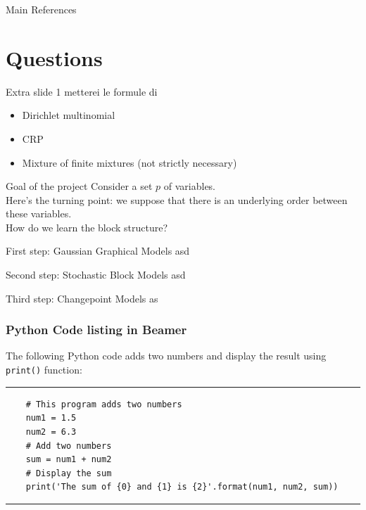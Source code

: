 \begin{frame}{Main References}
       \nocite{*}
        
        
\end{frame}

\section*{Questions}


\begin{frame}{Extra slide 1}
metterei le formule di 
\begin{itemize}
    \item Dirichlet multinomial
    \item CRP
    \item Mixture of finite mixtures (not strictly necessary)

    

\end{itemize} 
\end{frame}




\begin{frame}
    {Goal of the project}
    Consider a set $p$ of variables.\\
    Here's the turning point: we suppose that there is an underlying order between these variables.\\
    How do we learn the block structure?
\end{frame}

\begin{frame}{First step: Gaussian Graphical Models}
    asd
\end{frame}

\begin{frame}{Second step: Stochastic Block Models}
    asd
\end{frame}

\begin{frame}{Third step: Changepoint Models}
    as
\end{frame}


\begin{frame}[fragile]
\frametitle{Python Code listing in Beamer}
The following Python code adds two numbers and display the result using \verb|print()| function:
\rule{\textwidth}{1pt}
\scriptsize
\begin{verbatim}
    # This program adds two numbers
    num1 = 1.5
    num2 = 6.3
    # Add two numbers
    sum = num1 + num2
    # Display the sum
    print('The sum of {0} and {1} is {2}'.format(num1, num2, sum))
\end{verbatim}
\rule{\textwidth}{1pt}
\end{frame}


